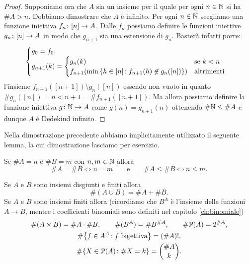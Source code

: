 \begin{proof}
Supponiamo ora che $A$ sia un insieme per il quale per ogni $n\in {\mathbb N}$ 
si ha $\#A > n$. 
Dobbiamo dimostrare che $A$ è infinito.
Per ogni $n\in {\mathbb N}$ scegliamo%
una funzione iniettiva $f_n\colon{\left[ n \right]}\to A$.
Dalle $f_n$ possiamo definire le funzioni iniettive $g_n\colon {\left[ n \right]}\to A$
in modo che $g_{n+1}$ sia una estensione di $g_n$.
Basterà infatti porre:
\[
  \begin{cases}
  g_0 = f_0,\\
  g_{n+1}(k) = \begin{cases}
    g_n(k) &\text{se $k<n$}\\
    f_{n+1}{\left( \min {\left\{ h\in {\left[ n \right]}\colon f_{n+1}(h)\not \in g_n({\left[ n \right]}) \right\}} \right)}
    & \text{altrimenti}
    \end{cases}
  \end{cases}
\]
l'insieme $f_{n+1}([n+1])\setminus g_n([n])$ essendo non vuoto 
in quanto $\# g_n([n]) = n < n+1 = \# f_{n+1}([n+1])$.
Ma allora possiamo definire la funzione iniettiva $g\colon {\mathbb N} \to A$
come $g(n) = g_{n+1}(n)$ ottenendo $\#{\mathbb N} \le \#A$ e dunque $A$ 
è Dedekind infinito.
\end{proof}

Nella dimostrazione precedente abbiamo implicitamente utilizzato il seguente lemma,
la cui dimostrazione lasciamo per esercizio.
\begin{lemma}
  Se $\#A = n$ e $\#B = m$ con $n,m\in {\mathbb N}$ allora 
  \[
    \#A = \#B \iff n=m
    \qquad \text{e}\qquad
    \#A \le \#B \iff n \le m.
  \]
\end{lemma}


\begin{exercise}
  \label{th:combinatoria}
  Se $A$ e $B$ sono insiemi disgiunti e finiti allora  
  \[
    \#(A\cup B) = \#A + \#B.
  \]
  Se $A$ e $B$ sono insiemi finiti allora 
  (ricordiamo che $B^A$ è l'insieme delle funzioni $A\to B$,
  mentre i coefficienti binomiali sono definiti nel capitolo
  \ref{ch:binomiale})
  \begin{gather*}
    \#(A \times B) = \#A\cdot \#B, \qquad
    \#(B^A) = \#B^{\#A}, \qquad
    \#\mathcal P(A) = 2^{\# A}, \\
    \#{\left\{ f\in A^A\colon \text{$f$ bigettiva} \right\}} = (\#A)!, \\
     \#{\left\{ X\in \mathcal P(A)\colon \#X = k \right\}}  
     = {\#A \choose k}. 
  \end{gather*}
\end{exercise}

